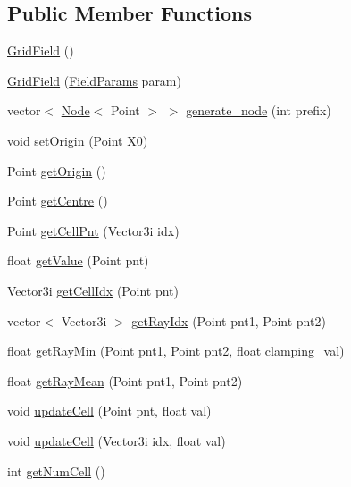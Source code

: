 \subsection*{Public Member Functions}
\begin{DoxyCompactItemize}
\item 
\hyperlink{struct_grid_field_a1c755284583cf0070cb3dbed9b5fe925}{Grid\+Field} ()
\item 
\hyperlink{struct_grid_field_ad1542bce01b2a0f0a5860e20ced0e24d}{Grid\+Field} (\hyperlink{struct_field_params}{Field\+Params} param)
\item 
vector$<$ \hyperlink{struct_node}{Node}$<$ Point $>$ $>$ \hyperlink{struct_grid_field_acd8fd9f0893ad94aa4f20b4b4d81802a}{generate\+\_\+node} (int prefix)
\item 
void \hyperlink{struct_grid_field_aa50e5e42c9932e52be3d1d9a38ebf28b}{set\+Origin} (Point X0)
\item 
Point \hyperlink{struct_grid_field_ab0d5ba92ad35ab9b7bdd29506b6753de}{get\+Origin} ()
\item 
Point \hyperlink{struct_grid_field_aacd39f9388090694e5c428cc612fd887}{get\+Centre} ()
\item 
Point \hyperlink{struct_grid_field_ab1a81e68d9e761cfb901c726bd9b0518}{get\+Cell\+Pnt} (Vector3i idx)
\item 
float \hyperlink{struct_grid_field_a9b1f94c44fc47953c38b8e2fe815860d}{get\+Value} (Point pnt)
\item 
Vector3i \hyperlink{struct_grid_field_a1a70c2de6239c1b086d01dc89b161b7c}{get\+Cell\+Idx} (Point pnt)
\item 
vector$<$ Vector3i $>$ \hyperlink{struct_grid_field_a7827c27a1d3b08f930c7f828eef14f0d}{get\+Ray\+Idx} (Point pnt1, Point pnt2)
\item 
float \hyperlink{struct_grid_field_af9f5144af2f0cdb99784ea54c42a8516}{get\+Ray\+Min} (Point pnt1, Point pnt2, float clamping\+\_\+val)
\item 
float \hyperlink{struct_grid_field_a3e49ca50129cb18db833bd4168c5d254}{get\+Ray\+Mean} (Point pnt1, Point pnt2)
\item 
void \hyperlink{struct_grid_field_a5f9debacee6e66e30a30ad7e0759ff15}{update\+Cell} (Point pnt, float val)
\item 
void \hyperlink{struct_grid_field_aeec99711fdc1486528b34fddff21c33f}{update\+Cell} (Vector3i idx, float val)
\item 
int \hyperlink{struct_grid_field_ae838908e288e110c7d1d680fadc6b2ba}{get\+Num\+Cell} ()
\end{DoxyCompactItemize}
